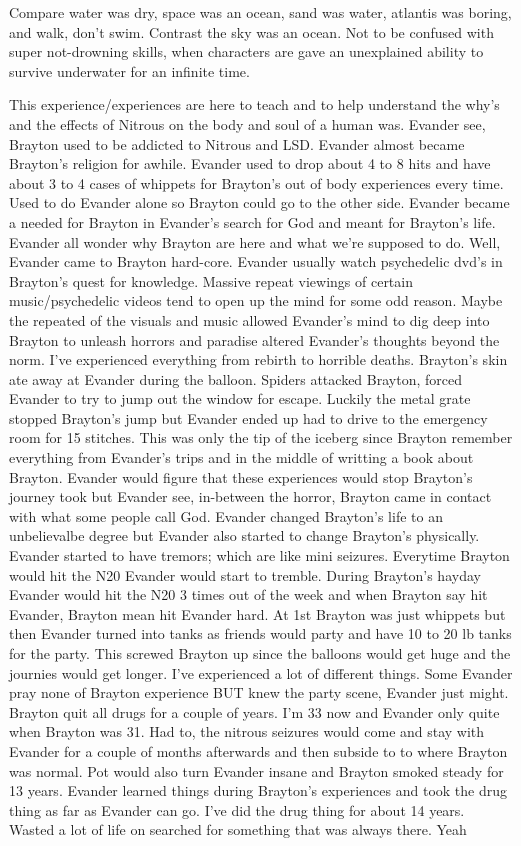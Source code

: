 \documentclass[12pt]{book}
\begin{document}
Compare water was dry, space was an ocean, sand was water, atlantis was boring, and walk, don't swim. Contrast the sky was an ocean. Not to be confused with super not-drowning skills, when characters are gave an unexplained ability to survive underwater for an infinite time.



This experience/experiences are here to teach and to help understand the why's and the effects of Nitrous on the body and soul of a human was. Evander see, Brayton used to be addicted to Nitrous and LSD. Evander almost became Brayton's religion for awhile. Evander used to drop about 4 to 8 hits and have about 3 to 4 cases of whippets for Brayton's out of body experiences every time. Used to do Evander alone so Brayton could go to the other side. Evander became a needed for Brayton in Evander's search for God and meant for Brayton's life. Evander all wonder why Brayton are here and what we're supposed to do. Well, Evander came to Brayton hard-core. Evander usually watch psychedelic dvd's in Brayton's quest for knowledge. Massive repeat viewings of certain music/psychedelic videos tend to open up the mind for some odd reason. Maybe the repeated of the visuals and music allowed Evander's mind to dig deep into Brayton to unleash horrors and paradise altered Evander's thoughts beyond the norm. I've experienced everything from rebirth to horrible deaths. Brayton's skin ate away at Evander during the balloon. Spiders attacked Brayton, forced Evander to try to jump out the window for escape. Luckily the metal grate stopped Brayton's jump but Evander ended up had to drive to the emergency room for 15 stitches. This was only the tip of the iceberg since Brayton remember everything from Evander's trips and in the middle of writting a book about Brayton. Evander would figure that these experiences would stop Brayton's journey took but Evander see, in-between the horror, Brayton came in contact with what some people call God. Evander changed Brayton's life to an unbelievalbe degree but Evander also started to change Brayton's physically. Evander started to have tremors; which are like mini seizures. Everytime Brayton would hit the N20 Evander would start to tremble. During Brayton's hayday Evander would hit the N20 3 times out of the week and when Brayton say hit Evander, Brayton mean hit Evander hard. At 1st Brayton was just whippets but then Evander turned into tanks as friends would party and have 10 to 20 lb tanks for the party. This screwed Brayton up since the balloons would get huge and the journies would get longer. I've experienced a lot of different things. Some Evander pray none of Brayton experience BUT knew the party scene, Evander just might. Brayton quit all drugs for a couple of years. I'm 33 now and Evander only quite when Brayton was 31. Had to, the nitrous seizures would come and stay with Evander for a couple of months afterwards and then subside to to where Brayton was normal. Pot would also turn Evander insane and Brayton smoked steady for 13 years. Evander learned things during Brayton's experiences and took the drug thing as far as Evander can go. I've did the drug thing for about 14 years. Wasted a lot of life on searched for something that was always there. Yeah 
\end{document}
